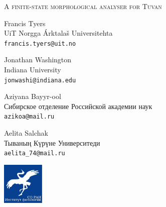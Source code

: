 \documentclass[fontscale=0.35,landscape,paperwidth=841mm,paperheight=1189mm]{baposter}  %
\begin{document}
\begin{poster}
{	}{ %
		{%
			{\titlefont \scshape{A finite-state morphological analyser for Tuvan}
			}
		}
	}{ %
		\begin{center}
			\begin{minipage}[t]{6em}
				\begin{spacing}{0.4}
				{Francis Tyers}\\
				{\footnotesize UiT Norgga Árktalaš Universitehta \\\texttt{francis.tyers@uit.no}}
				\end{spacing}
			\end{minipage}
			\begin{minipage}[t]{9.25em}
				\begin{spacing}{0.4}
					{Jonathan Washington}\\
					{\footnotesize Indiana University\\\texttt{jonwashi@indiana.edu}}
				\end{spacing}
			\end{minipage}
			\begin{minipage}[t]{8em} %
				\begin{spacing}{0.4}
					{Aziyana Bayyr-ool}\\
					{\footnotesize Сибирское отделение Российской академии наук\\\texttt{azikoa@mail.ru}}
				\end{spacing}
			\end{minipage}
			\begin{minipage}[t]{6em}
				\begin{spacing}{0.4}
					{Aelita Salchak}\\
					{\footnotesize Тываның Күрүне Университеди\\\texttt{aelita\_74@mail.ru}}
				\end{spacing}
			\end{minipage}
		\end{center}
	}{ %
		\setlength\fboxsep{0.5em}
		\setlength\fboxrule{0pt}
		\includegraphics[height=5.4em]{img/soranif}
}
\end{poster}
\end{document}
